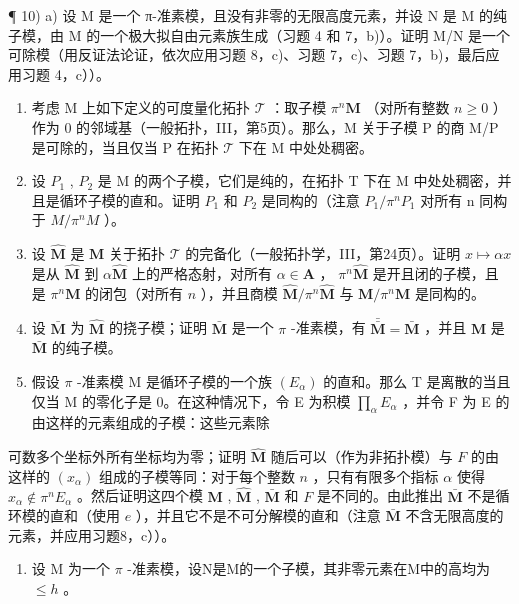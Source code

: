 ¶ 10) a) 设 M 是一个 π-准素模，且没有非零的无限高度元素，并设 N 是 M 的纯子模，由 M 的一个极大拟自由元素族生成（习题 4 和 7，b)）。证明 M/N 是一个可除模（用反证法论证，依次应用习题 8，c)、习题 7，c)、习题 7，b)，最后应用习题 4，c））。

\begin{enumerate}
\def\labelenumi{\alph{enumi})}
\setcounter{enumi}{1}
\item
  考虑 M 上如下定义的可度量化拓扑 \(\mathcal{T}\) ：取子模 \(\pi^n\mathbf{M}\) （对所有整数 \(n\geqslant 0\) ）作为 0 的邻域基（一般拓扑，III，第5页）。那么，M 关于子模 P 的商 M/P 是可除的，当且仅当 P 在拓扑 \(\mathcal{T}\) 下在 M 中处处稠密。
\item
  设 \(P_{1}\) , \(P_{2}\) 是 M 的两个子模，它们是纯的，在拓扑 T 下在 M 中处处稠密，并且是循环子模的直和。证明 \(P_{1}\) 和 \(P_{2}\) 是同构的（注意 \(P_{1}/\pi^{n}P_{1}\) 对所有 n 同构于 \(M/\pi^{n}M\) ）。
\item
  设 \(\hat{\mathbf{M}}\) 是 \(\mathbf{M}\) 关于拓扑 \(\mathcal{T}\) 的完备化（一般拓扑学，III，第24页）。证明 \(x \mapsto \alpha x\) 是从 \(\hat{\mathbf{M}}\) 到 \(\alpha \hat{\mathbf{M}}\) 上的严格态射，对所有 \(\alpha \in \mathbf{A}\) ， \(\pi^n \hat{\mathbf{M}}\) 是开且闭的子模，且是 \(\pi^n \mathbf{M}\) 的闭包（对所有 \(n\) ），并且商模 \(\hat{\mathbf{M}} / \pi^n \hat{\mathbf{M}}\) 与 \(\mathbf{M} / \pi^n \mathbf{M}\) 是同构的。
\item
  设 \(\bar{\mathbf{M}}\) 为 \(\hat{\mathbf{M}}\) 的挠子模；证明 \(\bar{\mathbf{M}}\) 是一个 \(\pi\) -准素模，有 \(\bar{\bar{\mathbf{M}}} = \bar{\mathbf{M}}\) ，并且 \(\mathbf{M}\) 是 \(\bar{\mathbf{M}}\) 的纯子模。
\item
  假设 \(\pi\) -准素模 M 是循环子模的一个族 \((E_{\alpha})\) 的直和。那么 T 是离散的当且仅当 M 的零化子是 0。在这种情况下，令 E 为积模 \(\prod_{\alpha} E_{\alpha}\) ，并令 F 为 E 的由这样的元素组成的子模：这些元素除
\end{enumerate}

可数多个坐标外所有坐标均为零；证明 \(\hat{\mathbf{M}}\) 随后可以（作为非拓扑模）与 \(F\) 的由这样的 \((x_{\alpha})\) 组成的子模等同：对于每个整数 \(n\) ，只有有限多个指标 \(\alpha\) 使得 \(x_{\alpha} \notin \pi^{n} E_{\alpha}\) 。然后证明这四个模 \(\mathbf{M}\) , \(\hat{\mathbf{M}}\) , \(\bar{\mathbf{M}}\) 和 \(F\) 是不同的。由此推出 \(\bar{\mathbf{M}}\) 不是循环模的直和（使用 \(e\) ），并且它不是不可分解模的直和（注意 \(\bar{\mathbf{M}}\) 不含无限高度的元素，并应用习题8，c））。

\begin{enumerate}
\def\labelenumi{\arabic{enumi})}
\setcounter{enumi}{10}
\tightlist
\item
  设 M 为一个 \(\pi\) -准素模，设N是M的一个子模，其非零元素在M中的高均为 \(\leqslant h\) 。
\end{enumerate}

